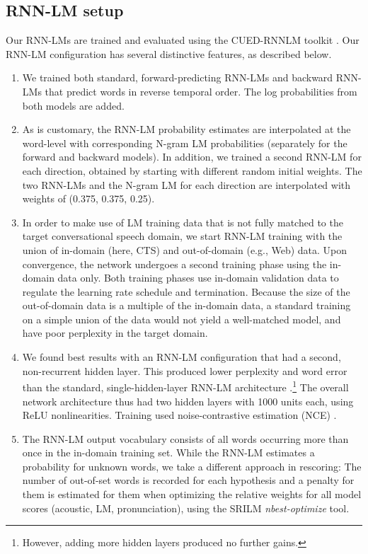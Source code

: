 \documentclass{article}
\begin{document}
\subsection{RNN-LM setup}
Our RNN-LMs are
trained and evaluated using the CUED-RNNLM toolkit \cite{chen2016cued}.
Our RNN-LM configuration has several distinctive features, as described below.
\begin{enumerate}
\item
	We trained both standard, forward-predicting RNN-LMs and backward RNN-LMs that predict words
	in reverse temporal order.
	The log probabilities from both models are added.
\item
	As is customary, the RNN-LM probability estimates are interpolated at the word-level with
	corresponding N-gram LM probabilities (separately for the forward and backward models).
	In addition, we trained a second RNN-LM for each direction, obtained by starting with different random 
	initial weights.
	The two RNN-LMs and the N-gram LM for each direction are interpolated with weights of (0.375, 0.375, 0.25).
\item
	In order to make use of LM training data that is not fully matched to the target conversational speech domain,
	we start RNN-LM training with the union of in-domain (here, CTS) and out-of-domain (e.g., Web) data.
	Upon convergence, the
	network undergoes a second training phase using the in-domain data only. Both training phases use in-domain
	validation data to regulate the learning rate schedule and termination.
	Because the size of the out-of-domain data is a multiple of the in-domain data, a standard training
	on a simple union of the data
	would not yield a well-matched model, and have poor perplexity in the target domain.
\item
	We found best results with an RNN-LM configuration that had a second, non-recurrent hidden layer.
	This produced lower perplexity and word error than the standard, single-hidden-layer RNN-LM architecture
	\cite{mikolov2010recurrent}.\footnote{However, adding more hidden layers produced no further gains.}
	The overall network architecture thus had two hidden layers with 1000 units each, using ReLU nonlinearities.
	Training used noise-contrastive estimation (NCE) \cite{Gutmann:NCE}.
\item
	The RNN-LM output vocabulary consists of all words occurring more than once in the in-domain training set.
	While the RNN-LM estimates a probability for unknown words, we take a different approach in rescoring:
	The number of out-of-set words is recorded for each hypothesis and a penalty for them is estimated for them
	when optimizing the relative weights for all model scores (acoustic, LM, pronunciation),
	using the SRILM {\em nbest-optimize} tool.
\end{enumerate}
\end{document}
